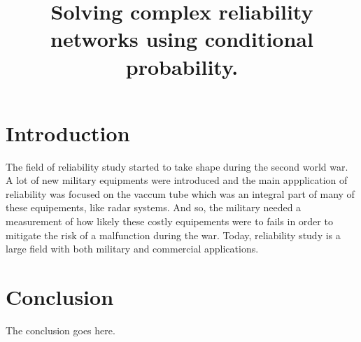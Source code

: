 \documentclass[conference]{IEEEtran}
\begin{document}
\title{Solving complex reliability networks using conditional probability.}

\author{
}

\maketitle

\begin{abstract}

\end{abstract}

\section{Introduction}
The field of reliability study started to take shape during the second world
war. A lot of new military equipments were introduced and the main appplication
of reliability was focused on the vaccum tube which was an integral part of many
of these equipements, like radar systems. And so, the military needed a
measurement of how likely these costly equipements were to fails in order to
mitigate the risk of a malfunction during the war. Today, reliability study
is a large field with both military and commercial applications.\\


\section{Conclusion}
The conclusion goes here.


\end{document}
